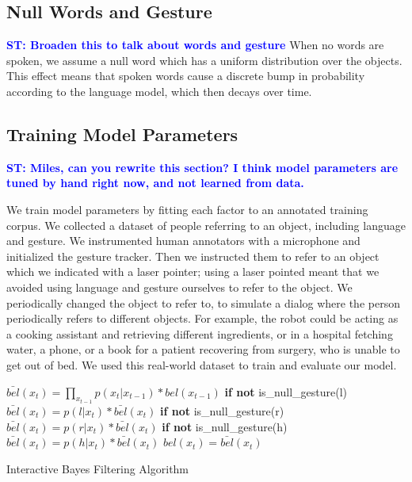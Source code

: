 \documentclass[letterpaper, 10 pt, conference]{ieeeconf}
\newcommand{\stnote}[1]{\textcolor{Blue}{\textbf{ST: #1}}}
\begin{document}
\subsection{Null Words and Gesture}

\stnote{Broaden this to talk about words and gesture}
When no words are spoken, we assume a null word which has a uniform
distribution over the objects.  This effect means that spoken words
cause a discrete bump in probability according to the language model,
which then decays over time.  

\subsection{Training Model Parameters}

\stnote{Miles, can you rewrite this section?  I think model parameters
  are tuned by hand right now, and not learned from data.}

We train model parameters by fitting each factor to an annotated
training corpus.  We collected a dataset of people referring to an
object, including language and gesture.  We instrumented human
annotators with a microphone and initialized the gesture tracker.
Then we instructed them to refer to an object which we indicated with
a laser pointer; using a laser pointed meant that we avoided using
language and gesture ourselves to refer to the object.  We periodically
changed the object to refer to, to simulate a dialog where the person
periodically refers to different objects.  For example, the robot
could be acting as a cooking assistant and retrieving different
ingredients, or in a hospital fetching water, a phone, or a book for a
patient recovering from surgery, who is unable to get out of bed.  We
used this real-world dataset to train and evaluate our model.

\begin{algorithm}
    \DontPrintSemicolon
    \BlankLine
    \BlankLine
     {
      $\bar{bel}(x_t) = \displaystyle\prod_{x_{t-1}} p(x_t|x_{t-1})*bel(x_{t-1})$
      \BlankLine
      \textbf{if not} is\_null\_gesture(l)
      \BlankLine
      \Indp$\bar{bel}(x_t) = p(l | x_t) *  \bar{bel}(x_t)$
      \BlankLine
      \Indm\textbf{if not} is\_null\_gesture(r)
      \BlankLine
      \Indp$\bar{bel}(x_t) = p(r | x_t) *  \bar{bel}(x_t)$
      \BlankLine
      \Indm\textbf{if not} is\_null\_gesture(h)
      \BlankLine
      \Indp$\bar{bel}(x_t) = p(h | x_t) *  \bar{bel}(x_t)$
      \BlankLine
      \Indm{}
      $bel(x_t) = \bar{bel}(x_t)$

    }
    \BlankLine
\caption{Interactive Bayes Filtering Algorithm} 
\label{alg:algorithm}
\end{algorithm}
\end{document}
